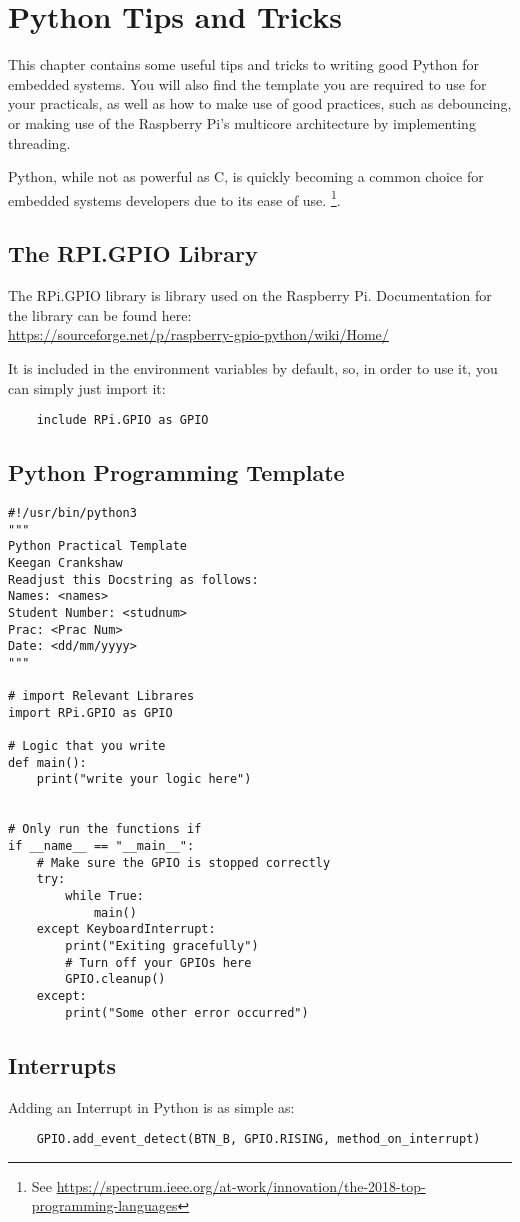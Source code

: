 \section{Python Tips and Tricks}
\label{app:Python}
This chapter contains some useful tips and tricks to writing good Python for embedded systems. You will also find the template you are required to use for your practicals, as well as how to make use of good practices, such as debouncing, or making use of the Raspberry Pi's multicore architecture by implementing threading.

Python, while not as powerful as C, is quickly becoming a common choice for embedded systems developers due to its ease of use. \footnote{See \href{https://spectrum.ieee.org/at-work/innovation/the-2018-top-programming-languages}{https://spectrum.ieee.org/at-work/innovation/the-2018-top-programming-languages}}. 

\subsection{The RPI.GPIO Library}
The RPi.GPIO library is library used on the Raspberry Pi. 
Documentation for the library can be found here:\\
\href{https://sourceforge.net/p/raspberry-gpio-python/wiki/Home/}{https://sourceforge.net/p/raspberry-gpio-python/wiki/Home/}

It is included in the environment variables by default, so, in order to use it, you can simply just import it:

\begin{verbatim}
    include RPi.GPIO as GPIO
\end{verbatim}

\subsection{Python Programming Template}
\begin{lstlisting}
#!/usr/bin/python3
"""
Python Practical Template
Keegan Crankshaw
Readjust this Docstring as follows:
Names: <names>
Student Number: <studnum>
Prac: <Prac Num>
Date: <dd/mm/yyyy>
"""

# import Relevant Librares
import RPi.GPIO as GPIO

# Logic that you write
def main():
    print("write your logic here")


# Only run the functions if 
if __name__ == "__main__":
	# Make sure the GPIO is stopped correctly
	try:
	    while True:
		    main()
	except KeyboardInterrupt:
		print("Exiting gracefully")
		# Turn off your GPIOs here
		GPIO.cleanup()
	except:
		print("Some other error occurred")

\end{lstlisting}

\subsection{Interrupts}
Adding an Interrupt in Python is as simple as:
\begin{verbatim}
    GPIO.add_event_detect(BTN_B, GPIO.RISING, method_on_interrupt)
\end{verbatim}

